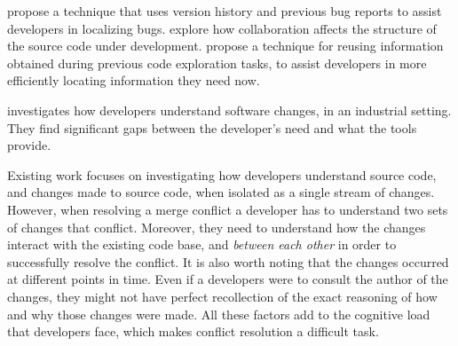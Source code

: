 \citet{wang2015version} propose a technique that uses version history and previous bug reports to assist developers in localizing bugs.
\citet{panichella2014how} explore how collaboration affects the structure of the source code under development.
\citet{robillard2008reusing} propose a technique for reusing information obtained during previous code exploration tasks, to assist developers in more efficiently locating information they need now.

\citet{tao2012software} investigates how developers understand software changes, in an industrial setting.
They find significant gaps between the developer's need and what the tools provide.

Existing work focuses on investigating how developers understand source code, and changes made to source code, when isolated as a single stream of changes.
However, when resolving a merge conflict a developer has to understand two sets of changes that conflict.
Moreover, they need to understand how the changes interact with the existing code base, and \emph{between each other} in order to successfully resolve the conflict.
It is also worth noting that the changes occurred at different points in time.
Even if a developers were to consult the author of the changes, they might not have perfect recollection of the exact reasoning of how and why those changes were made.
All these factors add to the cognitive load that developers face, which makes conflict resolution a difficult task.